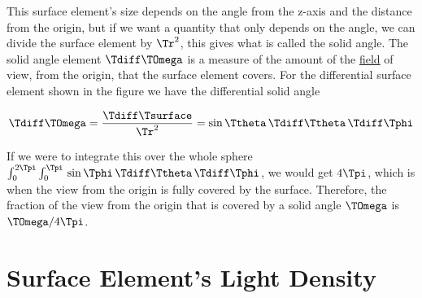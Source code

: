 This surface element's size depends on the angle from the z-axis and the distance from the origin, but if we want a quantity that only depends on the angle, we can divide the surface element by $\Tr ^2$, this gives what is called the solid angle.
The solid angle element $\Tdiff \TOmega $ is a measure of the amount of the \hyperlink{def-field}{field} of view, from the origin, that the surface element covers. For the differential surface element shown in the figure we have the differential solid angle

\begin{equation}
	\label{eq: solid angle}
	\Tdiff \TOmega  = \frac{\Tdiff \Tsurface }{\Tr ^2} = \sin\Ttheta  \,\Tdiff \Ttheta  \,\Tdiff \Tphi
\end{equation}

If we were to integrate this over the whole sphere $ \int_{0}^{2\Tpi } \int_{0}^{\Tpi } \, \sin \Tphi  \, \Tdiff \Ttheta  \, \Tdiff \Tphi $, we would get $4\Tpi $, which is when the view from the origin is fully covered by the surface.
Therefore, the fraction of the view from the origin that is covered by a solid angle $\TOmega $ is $\TOmega / 4\Tpi $.



\section{Surface Element's Light Density}\label{sect: Angular Density of Light from a Point Source}

